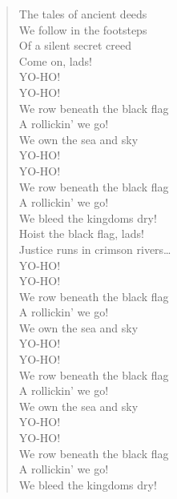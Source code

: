 \documentclass[11pt]{article}
\begin{document}
\begin{verse}
The tales of ancient deeds\\
We follow in the footsteps\\
Of a silent secret creed\\
Come on, lads!\\
\vspace*{1em}
YO-HO!\\
YO-HO!\\
We row beneath the black flag\\
A rollickin' we go!\\
We own the sea and sky\\
YO-HO!\\
YO-HO!\\
We row beneath the black flag\\
A rollickin' we go!\\
We bleed the kingdoms dry!\\
\vspace*{1em}
Hoist the black flag, lads!\\
\vspace*{1em}
Justice runs in crimson rivers\ldots{}\\
\vspace*{1em}
YO-HO!\\
YO-HO!\\
We row beneath the black flag\\
A rollickin' we go!\\
We own the sea and sky\\
YO-HO!\\
YO-HO!\\
We row beneath the black flag\\
A rollickin' we go!\\
We own the sea and sky\\
YO-HO!\\
YO-HO!\\
We row beneath the black flag\\
A rollickin' we go!\\
We bleed the kingdoms dry!\\
\end{verse}
\clearpage
\end{document}
